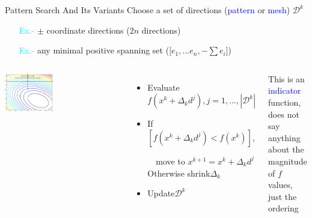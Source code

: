 \documentclass[handout,aspectratio=54]{beamer}
\numberwithin{theorem}{section}
\begin{document}
\begin{frame}{Pattern Search And Its Variants}\footnotesize
Choose a set of directions (\textcolor{blue}{pattern} or \textcolor{blue}{mesh}) $\mathcal{D}^k$

\begin{itemize}
\item[\textcolor{cyan}{Ex.-}] $\pm$ coordinate directions ($2n$ directions)
\item[\textcolor{cyan}{Ex.-}] any minimal positive spanning set ([$e_1,...e_n,-\sum e_i$])
\end{itemize}

\begin{columns}
\includegraphics[width=\textwidth]{fig/17-3.jpg}

\colorbox[rgb]{0.5,0.6,0.7}{\textcolor{white}{Basic iteration($k\ge0$):}}
\begin{itemize}\scriptsize
\item Evaluate $f(x^k+\Delta_kd^j),j=1,...,|\mathcal{D}^k|$
\item If $[f(x^k+\Delta_kd^j)<f(x^k)]$, 

$\quad$move to $x^{k+1}=x^k+\Delta_kd^j$\\

Otherwise shrink$\Delta_k$
\item Update$\mathcal{D}^k$
\end{itemize}
This is an \textcolor{blue}{indicator} function, does not say anything about the magnitude of $f$ values, just the ordering
\end{columns}

\vspace{1.2cm}

\tiny
{}

\end{frame}
\end{document}
